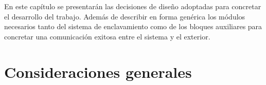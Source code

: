 % 
%
%
%
%
%
%
%
%
%	
%		
%
%		
%		
%		
%		


En este capítulo se presentarán las decisiones de diseño adoptadas para concretar el desarrollo del trabajo. Además de describir en forma genérica los módulos necesarios tanto del sistema de enclavamiento como de los bloques auxiliares para concretar una comunicación exitosa entre el sistema y el exterior.


\section{Consideraciones generales}

